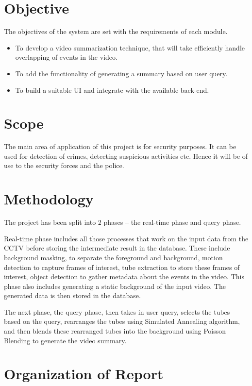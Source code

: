 \section{Objective}

The objectives of the system are set with the requirements of each module.
\begin{itemize}
    \item To develop a video summarization technique, that will take
    efficiently handle overlapping of events in the video.
    \item To add the functionality of generating a summary based on user query.
    \item To build a suitable UI and integrate with the
    available back-end.
\end{itemize}

\section{Scope}

The main area of application of this project is for security purposes. It can be
used for detection of crimes, detecting suspicious activities
\cite{boiman2007detecting} etc. Hence it will be of use to the security
forces and the police.

\section{Methodology}

The project has been split into 2 phases – the real-time phase and query phase.

Real-time phase includes all those processes that work on the input data from
the CCTV before storing the intermediate result in the database. These include
background masking, to separate the foreground and background, motion detection
to capture frames of interest, tube extraction to store these frames of
interest, object detection to gather metadata about the events in the video.
This phase also includes generating a static background of the input video.
The generated data is then stored in the database.

The next phase, the query phase, then takes in user query, selects the tubes
based on the query, rearranges the tubes using Simulated Annealing algorithm,
and then blends these rearranged tubes into the background using Poisson
Blending to generate the video summary.


\section{Organization of Report}

